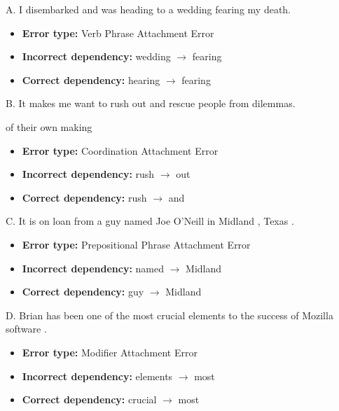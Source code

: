 \documentclass[a4 paper]{article}
\begin{document}
A. I disembarked and was heading to a wedding fearing my death.

\begin{itemize}
    \item \textbf{Error type:} Verb Phrase Attachment Error
    \item \textbf{Incorrect dependency:} wedding $\rightarrow$ fearing
    \item \textbf{Correct dependency:} hearing $\rightarrow$ fearing
\end{itemize}

B. It makes me want to rush out and rescue people from dilemmas.

of their own making
\begin{itemize}
    \item \textbf{Error type:} Coordination Attachment Error
    \item \textbf{Incorrect dependency:} rush $\rightarrow$ out
    \item \textbf{Correct dependency:} rush $\rightarrow$ and
\end{itemize}

C. It is on loan from a guy named Joe O’Neill in Midland , Texas .

\begin{itemize}
    \item \textbf{Error type:} Prepositional Phrase Attachment Error
    \item \textbf{Incorrect dependency:} named $\rightarrow$ Midland
    \item \textbf{Correct dependency:} guy $\rightarrow$ Midland
\end{itemize}

D. Brian has been one of the most crucial elements to the success of Mozilla software .

\begin{itemize}
    \item \textbf{Error type:} Modifier Attachment Error
    \item \textbf{Incorrect dependency:} elements $\rightarrow$ most
    \item \textbf{Correct dependency:} crucial $\rightarrow$ most
\end{itemize}
\end{document}
